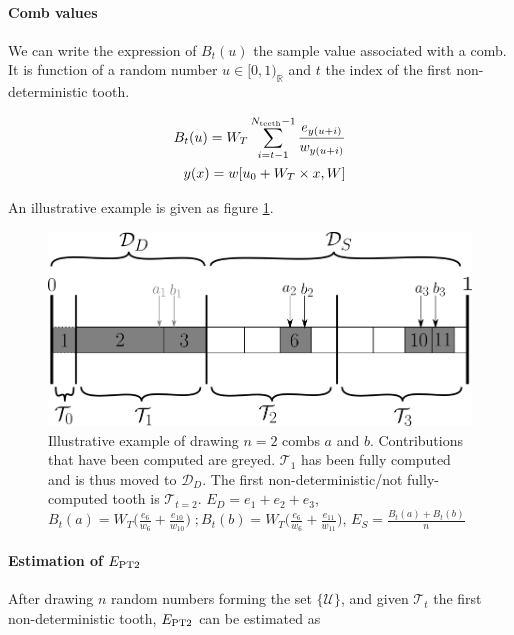 \documentclass[./thesis.tex]{subfiles}
\begin{document}
\paragraph{Comb values}

We can write the expression of $B_t(u)$ the sample value associated with a comb. It is function of a random number $u \in [0,1)_\mathbb{R}$ and $t$ the index of the first non-deterministic tooth.

\begin{align}
\label{eq:combvalue}
B_t(u) = W_T \sum_{i=t-1}^{N_\text{teeth}-1} \frac{e_{y(u+i)}}{w_{y(u+i)}} \\
y(x)=w[u_0+ W_T \times x, W]
\end{align}

An illustrative example is given as figure \ref{fig:toothindet}.

 \begin{figure}[h!]
	\begin{center}
		\includegraphics[width=0.75\columnwidth]{figures/pt2/toothindet}
	\end{center}
		\caption{Illustrative example of drawing $n=2$ combs $a$ and $b$. Contributions that have been computed are greyed. $\mathcal{T}_1$ has been fully computed and is thus moved to $\mathcal{D}_D$. The first non-deterministic/not fully-computed tooth is $\mathcal{T}_{t=2}$.
		$ E_D = e_1 + e_2 + e_3 $, 
		$B_t(a) = W_T \Big ( \frac{e_6}{w_6} + \frac{e_{10}}{w_{10}} \Big ) \;;B_t(b) = W_T \Big ( \frac{e_6}{w_6} + \frac{e_{11}}{w_{11}} \Big )$, 
		$E_S = \frac{B_t(a)+B_t(b)}{n}$}
		\label{fig:toothindet}
\end{figure}

\paragraph{Estimation of $E_\text{PT2}$}

After drawing $n$ random numbers forming the set $\{\mathcal{U}\}$, and given $\mathcal{T}_t$ the first non-deterministic tooth, $E_\text{PT2}$ can be estimated as 
\end{document}
